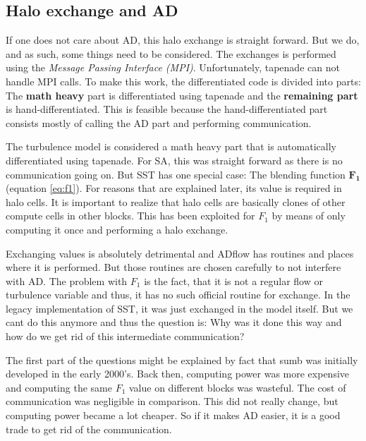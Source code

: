 \subsection{Halo exchange and AD}
If one does not care about AD, this halo exchange is straight forward. But we
do, and as such, some things need to be considered. The exchanges is performed
using the \textit{Message Passing Interface (MPI)}. Unfortunately, tapenade can
not handle MPI calls. To make this work, the differentiated code is divided
into parts: The \textbf{math heavy} part is differentiated using tapenade and
the \textbf{remaining part} is hand-differentiated. This is feasible because
the hand-differentiated part consists mostly of calling the AD part and
performing communication. 

The turbulence model is considered a math heavy part that is automatically
differentiated using tapenade. For SA, this was straight forward as there is no
communication going on. But SST has one special case: The blending function
$\mathbf{F_1}$ (equation \ref{eq:f1}). For reasons that are explained later,
its value is required in halo cells. It is important to realize that halo cells
are basically clones of other compute cells in other blocks. This has been
exploited for $F_1$ by means of only computing it once and performing a halo
exchange.

Exchanging values is absolutely detrimental and ADflow has routines and places
where it is performed. But those routines are chosen carefully to not
interfere with AD. The problem with $F_1$ is the fact, that it is not a regular
flow or turbulence variable and thus, it has no such official routine for
exchange. In the legacy implementation of SST, it was just exchanged in the
model itself. But we cant do this anymore and thus the question is: Why was it
done this way and how do we get rid of this intermediate communication?

The first part of the questions might be explained by fact that sumb was
initially developed in the early 2000's. Back then, computing power was more
expensive and computing the same $F_1$ value on different blocks was
wasteful. The cost of communication was negligible in comparison. This did not
really change, but computing power became a lot cheaper. So if it makes AD
easier, it is a good trade to get rid of the communication.








